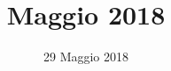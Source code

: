 


\title{ Maggio 2018}
\author{\GroupName}

\date{29 Maggio 2018}



\makeFrontPage

    \frenchspacing

    


